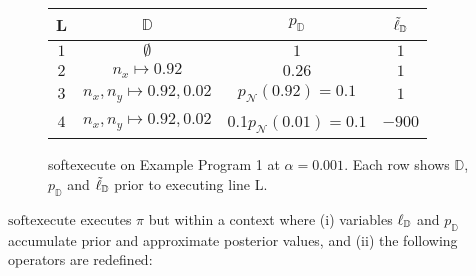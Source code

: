 
\begin{figure}
\begin{center}
  \begin{tabular}{ |c|c|c|c| } 
   \hline
   L & $\mathbb{D}$ &  $p_\mathbb{D}$ & $\tilde{\ell}_\mathbb{D}$ \\
   \hline
   $1$ & $\emptyset$ & $1$ & $1$ \\ 
   $2$ & $ n_x \mapsto 0.92$ & $0.26$ & $1$ \\ 
   $3$ &  $n_x, n_y \mapsto 0.92, 0.02$ & $p_\mathcal{N}(0.92) = 0.1$ & $1$ \\
   $4$ & $n_x, n_y \mapsto 0.92, 0.02$ & 0.1$p_\mathcal{N}(0.01)=0.1$ & $-900$ \\ 
   \hline
  \end{tabular}
\end{center}
\caption{softexecute on Example Program 1 at $\alpha = 0.001$.  Each row shows $\mathbb{D}$,  $p_\mathbb{D}$ and $\tilde{\ell}_\mathbb{D}$ prior to executing line L.}
\end{figure}


$\textrm{softexecute}$ executes $\pi$ but within a context where (i) variables $\operatorname{\ell}_\mathbb{D}$ and $p_\mathbb{D}$ accumulate prior and approximate posterior values, and (ii) the following operators are redefined:

